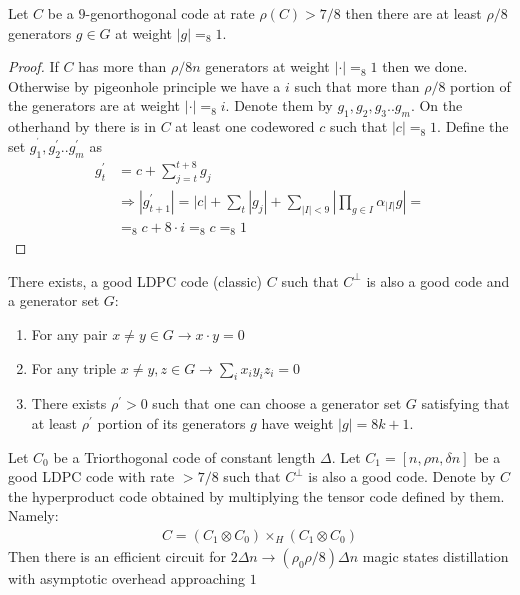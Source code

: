 \documentclass[manuscript,screen,review]{acmart}
\begin{document}
\begin{claim}
  Let $C$ be a $9$-genorthogonal code at rate $\rho(C) > 7/8 $ then there are at least $\rho/8$ generators $g \in G$ at weight $|g| =_{8} 1$.
\end{claim}
\begin{proof}
  If $C$ has more than $\rho/8 n$ generators at weight $| \cdot | =_{8} 1$ then we done. Otherwise by pigeonhole principle we have a $i$ such that more than $\rho/8$ portion of the generators are at weight $ |\cdot| =_{8} i$. Denote them by $g_{1},g_{2},g_{3}..g_{m}$. On the otherhand by  there is in $C$ at least one codewored $c$ such that $|c| =_{8} 1$. Define the set $g_{1}^{^\prime},g_{2}^{\prime}..g_{m}^{\prime}$ as   
  \begin{equation*}
    \begin{split}
      g^{\prime}_{t} & = c + \sum_{j=t}^{t+8}g_{j} \\
      & \Rightarrow |g^{\prime}_{t+1}| = |c| + \sum_{t}{ |g_{j}| } + \sum_{|I|<9}|\prod_{g \in I} \alpha_{|I|} g | =\\
      & =_{8} c + 8\cdot i =_{8} c =_{8} 1  
    \end{split}
  \end{equation*} 
\end{proof}

\begin{claim}
  There exists, a good LDPC code (classic) $C$ such that $C^{\perp}$ is also a good code and a generator set $G$:  
  \begin{enumerate}
    \item For any pair $x \neq y \in G \rightarrow x\cdot y = 0$
    \item For any triple $x\neq y,z \in G \rightarrow \sum_{i}x_{i}y_{i}z_{i} = 0$
    \item  There exists $\rho^{\prime} > 0$ such that one can choose a generator set $G$ satisfying that at least $\rho^{\prime}$ portion of its generators $g$ have weight $|g| = 8k + 1$.
  \end{enumerate}
\end{claim}


\begin{claim} 
Let $C_0$ be a Triorthogonal code of constant length $\Delta$. Let $C_1 = [n, \rho n, \delta n]$ be a good LDPC code with rate $>7/8$ such that $C^{\perp}$ is also a good code. Denote by $C$ the hyperproduct code obtained by multiplying the tensor code defined by them. Namely:
  \begin{equation*}
    \begin{split}
      C = \left( C_{1} \otimes C_{0} \right) \times_{H} \left( C_{1} \otimes C_{0} \right)
    \end{split}
  \end{equation*} 
Then there is an efficient circuit for $2\Delta n \rightarrow (\rho_{0}\rho/8) \Delta n$ magic states distillation with asymptotic overhead approaching $1$ 
\end{claim}
\end{document}
